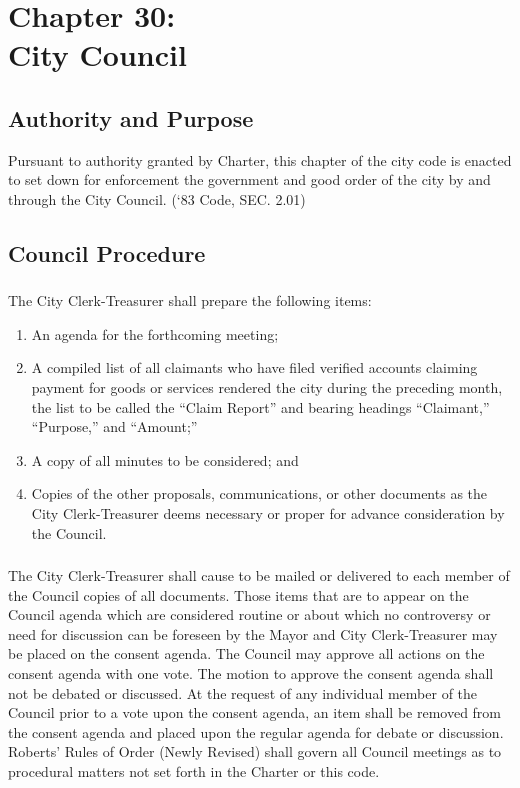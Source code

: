 \chapter*{Chapter 30: \\
	City Council}
    \minitoc
    \pagebreak

\section{Authority and Purpose}
Pursuant to authority granted by Charter, this chapter of the city code is enacted to set down for enforcement the government and good order of the city by and through the City Council.  (‘83 Code, SEC. 2.01)


\section{Council Procedure}
\subsection{}
The City Clerk-Treasurer shall prepare the following items:
\begin{enumerate}
    \item An agenda for the forthcoming meeting;
    \item A compiled list of all claimants who have filed verified accounts claiming payment for goods or services rendered the city during the preceding month, the list to be called the “Claim Report” and bearing headings “Claimant,” “Purpose,” and “Amount;”
    \item A copy of all minutes to be considered; and
    \item Copies of the other proposals, communications, or other documents as the City Clerk-Treasurer deems necessary or proper for advance consideration by the Council.
\end{enumerate}
\subsection{}
The City Clerk-Treasurer shall cause to be mailed or delivered to each member of the Council copies of all documents.  Those items that are to appear on the Council agenda which are considered routine or about which no controversy or need for discussion can be foreseen by the Mayor and City Clerk-Treasurer may be placed on the consent agenda.  The Council may approve all actions on the consent agenda with one vote.  The motion to approve the consent agenda shall not be debated or discussed.  At the request of any individual member of the Council prior to a vote upon the consent agenda, an item shall be removed from the consent agenda and placed upon the regular agenda for debate or discussion.  Roberts’ Rules of Order (Newly Revised) shall govern all Council meetings as to procedural matters not set forth in the Charter or this code.
